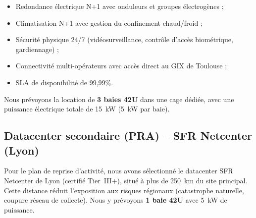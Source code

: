 \documentclass[12pt,a4paper]{report}
\begin{document}
\begin{itemize}
\item Redondance électrique N+1 avec onduleurs et groupes électrogènes ;
\item Climatisation N+1 avec gestion du confinement chaud/froid ;
\item Sécurité physique 24/7 (vidéosurveillance, contrôle d'accès biométrique, gardiennage) ;
\item Connectivité multi-opérateurs avec accès direct au GIX de Toulouse ;
\item SLA de disponibilité de 99,99\%.
\end{itemize}

Nous prévoyons la location de \textbf{3 baies 42U} dans une cage dédiée, avec une puissance électrique totale de 15~kW (5~kW par baie).

\subsection{Datacenter secondaire (PRA) -- SFR Netcenter (Lyon)}

Pour le plan de reprise d'activité, nous avons sélectionné le datacenter SFR Netcenter de Lyon (certifié Tier~III+), situé à plus de 250~km du site principal. Cette distance réduit l'exposition aux risques régionaux (catastrophe naturelle, coupure réseau de collecte). Nous y prévoyons \textbf{1 baie 42U} avec 5~kW de puissance.
\end{document}
